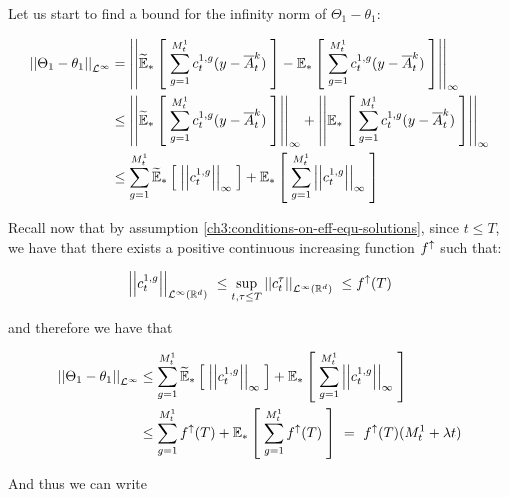 	Let us start to find a bound for the infinity norm of $\Theta_1 - \theta_1$:
	
	\begin{align*}
		\left|\left| 
			\Theta_1 - \theta_1
		 \right|\right|_{\mathcal{L}^\infty}
		&=\left|\left| 
			\widetilde{\mathbb{E}}_{\ast} \left[ \; 
				\sum _{g = 1}^{M_t^1}
				c_t^{1,g}
				(y - \overline{A}_t^k)
			 \; \right]
			-
			\mathbb{E}_{\ast} \left[ \; 
				\sum _{g = 1}^{M_t^1}
				c_t^{1,g}
				(y - \overline{A}_t^k)
			 \; \right]
		 \right|\right|_\infty
		\\
		&\leq
		\left|\left| 
			\widetilde{\mathbb{E}}_{\ast} \left[ \; 
				\sum _{g = 1}^{M_t^1}
				c_t^{1,g}
				(y - \overline{A}_t^k)
			 \; \right]
		 \right|\right|_\infty
		+
		\left|\left| 
			\mathbb{E}_{\ast} \left[ \; 
				\sum _{g = 1}^{M_t^1}
				c_t^{1,g}
				(y - \overline{A}_t^k)
			 \; \right]
		 \right|\right|_\infty
		\\
		&\leq
		\sum _{g = 1}^{M_t^1}
		\widetilde{\mathbb{E}}_{\ast} \left[ \; 
			\left|\left| 
				c_t^{1,g}
			 \right|\right|_\infty
		 \; \right]
		+
		\mathbb{E}_{\ast} \left[ \; 
			\sum _{g = 1}^{M_t^1}
			\left|\left| 
				c_t^{1,g}
			 \right|\right|_\infty
		 \; \right]
	\end{align*}
	
	Recall now that by assumption \ref{ch3:conditions-on-eff-equ-solutions}, since $t\leq T$, we have that there exists a positive continuous increasing function $f^\uparrow$ such that:
	
	\begin{equation*}
			\left|\left| c_t^{1,g} \right|\right|_{\mathcal{L}^\infty(\mathbb{R}^d)}\
		\leq
			\sup_{t,\tau \leq T}
			\left|\left| c_t^\tau \right|\right|_{\mathcal{L}^\infty(\mathbb{R}^d)}\
		\leq
			f^\uparrow(T)
	\end{equation*}
	
	and therefore we have that
	
	\begin{align*}
		\left|\left| 
			\Theta_1 - \theta_1
		 \right|\right|_{\mathcal{L}^\infty}
		&\leq
		\sum _{g = 1}^{M_t^1}
		\widetilde{\mathbb{E}}_{\ast} \left[ \; 
			\left|\left| 
				c_t^{1,g}
			 \right|\right|_\infty
		 \; \right]
		+
		\mathbb{E}_{\ast} \left[ \; 
			\sum _{g = 1}^{M_t^1}
			\left|\left| 
				c_t^{1,g}
			 \right|\right|_\infty
		 \; \right]
		\\
		&\leq
		\sum _{g = 1}^{M_t^1}
		f^\uparrow(T)
		+
		\mathbb{E}_{\ast} \left[ \; 
			\sum _{g = 1}^{M_t^1}
			f^\uparrow(T)
		 \; \right]\
		=\
		f^\uparrow(T)
		(M_t^1 + \lambda t)
	\end{align*}
	
	And thus we can write 
	
